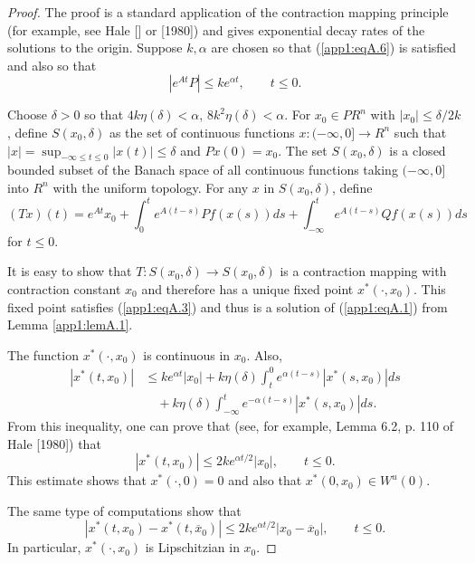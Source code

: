 \documentclass{surv-l}
\theoremstyle{plain}
\theoremstyle{definition}
\numberwithin{equation}{section}
\numberwithin{figure}{chapter}
\begin{document}
\begin{proof}
The proof is a standard application of the contraction mapping principle (for example, see Hale [\citeyear{1969h}] or [1980]) and gives exponential decay rates of the solutions to the origin. Suppose $k,\alpha$ are chosen so that (\ref{app1:eqA.6}) is satisfied and also so that
\begin{equation}\label{app1:eqA.7}
|e^{At}P|\leq ke^{\alpha t},\qquad t\leq 0.
\end{equation}

Choose $\delta>0$ so that $4k\eta(\delta)<\alpha$, $8k^{2}\eta(\delta)<\alpha$. For $x_{0}\in PR^{n}$ with $|x_{0}|\leq\delta/2k$, define $S(x_{0},\delta)$ as the set of continuous functions $x$:$\,(-\infty,0]\rightarrow R^{n}$ such that $|x|=\sup_{-\infty\leq t\leq 0}|x(t)|\leq\delta$ and $Px(0)=x_{0}$. The set $S(x_{0},\delta)$ is a closed bounded subset of the Banach space of all continuous functions taking $(-\infty, 0]$ into $R^{n}$ with the uniform topology. For any $x$ in $S(x_{0}, \delta)$, define
\begin{equation}\label{app1:eqA.8}
(Tx)(t)=e^{At}x_{0}+\int_{0}^{t}e^{A(t-s)}Pf(x(s))ds+\int_{-\infty}^{t}e^{A(t-s)}Qf(x(s))ds
\end{equation}
for $t\leq 0$.

It is easy to show that $T$:$\,S(x_{0},\delta)\rightarrow S(x_{0}, \delta)$ is a contraction mapping with contraction constant $x_{0}$ and therefore has a unique fixed point $x^{\ast}(\cdot, x_{0})$. This fixed point satisfies (\ref{app1:eqA.3}) and thus is a solution of (\ref{app1:eqA.1}) from Lemma \ref{app1:lemA.1}.

The function $x^{\ast}(\cdot, x_{0})$ is continuous in $x_{0}$. Also,
\begin{align*}
|x^{\ast}(t, x_{0})|&\leq ke^{\alpha t}|x_{0}|+k\eta(\delta)\int_{t}^{0}e^{\alpha(t-s)}|x^{\ast}(s, x_{0})|ds\\
&\quad +k\eta(\delta)\int_{-\infty}^{t}e^{-\alpha(t-s)}|x^{\ast}(s, x_{0})|ds.
\end{align*}
From this inequality, one can prove that (see, for example, Lemma 6.2, p. 110 of Hale [1980]) that
\begin{equation}\label{app1:eqA.9}
|x^{\ast}(t, x_{0})|\leq 2ke^{\alpha t/2}|x_{0}|,\qquad t\leq 0.
\end{equation}
This estimate shows that $x^{\ast}(\cdot, 0)=0$ and also that $x^{\ast}(0, x_{0})\in W^{u}(0)$.

The same type of computations show that
\begin{equation}\label{app1:eqA.10}
|x^{\ast}(t, x_{0}) - x^{\ast}(t, \overline{x}_{0})|\leq 2ke^{\alpha t/2}|x_{0}-\overline{x}_{0}|,\qquad t\leq 0.
\end{equation}
In particular, $x^{\ast}(\cdot, x_{0})$ is Lipschitzian in $x_{0}$.


\end{proof}
\end{document}
